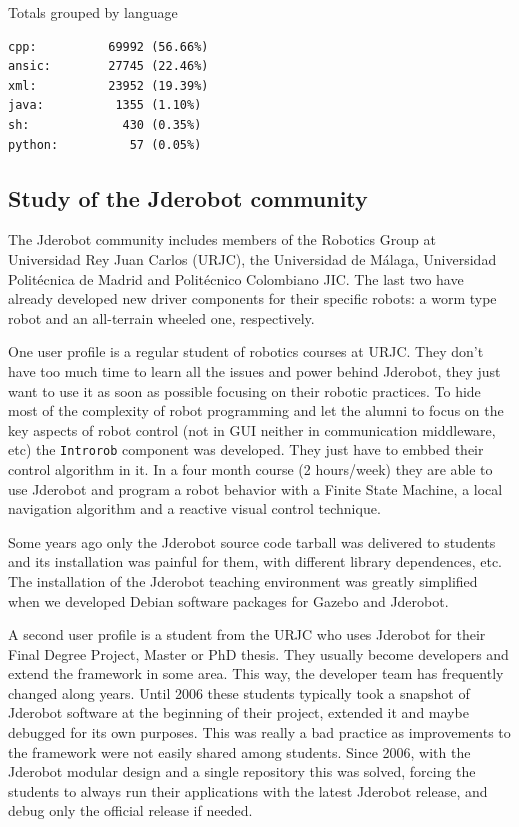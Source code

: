 \documentclass[twocolumn]{svjour3}          %
\begin{document}
Totals grouped by language
\begin{verbatim}
cpp:          69992 (56.66%)
ansic:        27745 (22.46%)
xml:          23952 (19.39%)
java:          1355 (1.10%)
sh:             430 (0.35%)
python:          57 (0.05%)
\end{verbatim}

\subsection{Study of the Jderobot community}
The Jderobot community includes members of the Robotics Group at Universidad Rey Juan Carlos (URJC), the Universidad de M\'alaga, Universidad Polit\'ecnica de Madrid and Politécnico Colombiano JIC. The last two have already developed new driver components for their specific robots: a worm type robot and an all-terrain wheeled one, respectively.

One user profile is a regular student of robotics courses at URJC. They don't have too much time to learn all the issues and power behind Jderobot, they just want to use it as soon as possible focusing on their robotic practices. To hide most of the complexity of robot programming and let the alumni to focus on the key aspects of robot control (not in GUI neither in communication middleware, etc) the \texttt{Introrob} component was developed. They just have to embbed their control algorithm in it. In a four month course (2 hours/week) they are able to use Jderobot and program a robot behavior with a Finite State Machine, a local navigation algorithm and a reactive visual control technique. 

Some years ago only the Jderobot source code tarball was delivered to students and its installation was painful for them, with different library dependences, etc. The installation of the Jderobot teaching environment was greatly simplified when we developed Debian software packages for Gazebo and Jderobot.

A second user profile is a student from the URJC who uses Jderobot for their Final Degree Project, Master or PhD thesis. They usually become developers and extend the framework in some area. This way, the developer team has frequently changed along years. Until 2006 these students typically took a snapshot of Jderobot software at the beginning of their project, extended it and maybe debugged for its own purposes. This was really a bad practice as improvements to the framework were not easily shared among students. Since 2006, with the Jderobot modular design and a single repository this was solved, forcing the students to always run their applications with the latest Jderobot release, and debug only the official release if needed.
\end{document}
